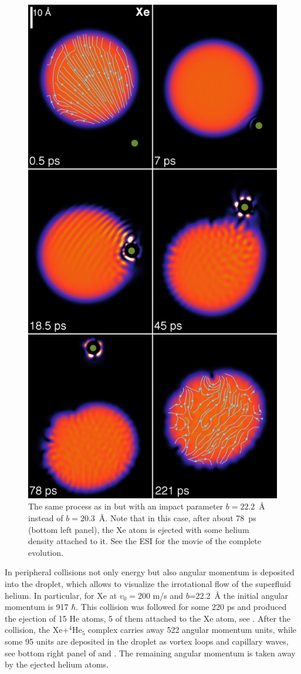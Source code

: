 \begin{figure}[h]
\centerline{\includegraphics[width=0.60\linewidth,clip]{xehe200-b222-composed}}
\caption{\label{fig6-capture} 
The same process as in  but with an impact parameter $b = 22.2$~\AA{} instead of $b = 20.3$~\AA{}. Note that in this case, after about 78~ps (bottom left panel), the Xe atom is ejected with some helium density attached to it. See the ESI\citep{Coppens2017-2} for the movie of the complete evolution.   
}
\end{figure}
%

In peripheral collisions not only energy but also angular momentum 
is deposited into the droplet, which allows  
to visualize the  irrotational flow of the superfluid helium.
In particular,
for Xe at $v_0=$200 m/s and $b$=22.2~\AA{} the initial angular momentum is 917 $\hbar$. 
This collision was followed for some 220 ps and
produced the ejection of 15 He atoms, 5 of them attached to the Xe atom, see . 
After the collision, the Xe+$^4$He$_5$ complex carries away 522 
angular momentum units, while some 95 units are deposited in the droplet as vortex loops and
capillary waves\citep{Whitaker1998}, see bottom right panel of  and . 
The remaining angular momentum is taken away by the ejected helium atoms.

